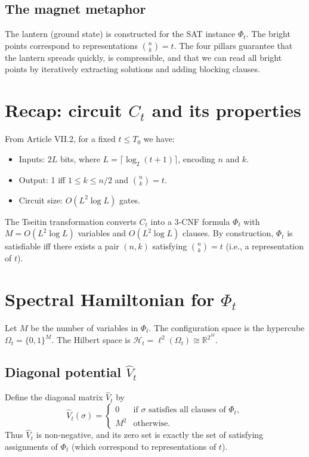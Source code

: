 \documentclass[11pt,a4paper]{article}
\begin{document}
\subsection{The magnet metaphor}

The lantern (ground state) is constructed for the SAT instance \(\Phi_t\). The bright points correspond to representations \(\binom{n}{k}=t\). The four pillars guarantee that the lantern spreads quickly, is compressible, and that we can read all bright points by iteratively extracting solutions and adding blocking clauses.

\section{Recap: circuit \(C_t\) and its properties}

From Article VII.2, for a fixed \(t \le T_0\) we have:
\begin{itemize}
\item Inputs: \(2L\) bits, where \(L = \lceil \log_2(t+1)\rceil\), encoding \(n\) and \(k\).
\item Output: 1 iff \(1\le k\le n/2\) and \(\binom{n}{k}=t\).
\item Circuit size: \(O(L^2 \log L)\) gates.
\end{itemize}

The Tseitin transformation converts \(C_t\) into a 3‑CNF formula \(\Phi_t\) with \(M = O(L^2 \log L)\) variables and \(O(L^2 \log L)\) clauses. By construction, \(\Phi_t\) is satisfiable iff there exists a pair \((n,k)\) satisfying \(\binom{n}{k}=t\) (i.e., a representation of \(t\)).

\section{Spectral Hamiltonian for \(\Phi_t\)}

Let \(M\) be the number of variables in \(\Phi_t\). The configuration space is the hypercube \(\Omega_t = \{0,1\}^M\). The Hilbert space is \(\mathcal{H}_t = \ell^2(\Omega_t) \cong \mathbb{R}^{2^M}\).

\subsection{Diagonal potential \(\hat{V}_t\)}
Define the diagonal matrix \(\hat{V}_t\) by
\[
\hat{V}_t(\sigma) = \begin{cases}
0 & \text{if }\sigma\text{ satisfies all clauses of } \Phi_t,\\
M^2 & \text{otherwise}.
\end{cases}
\]
Thus \(\hat{V}_t\) is non‑negative, and its zero set is exactly the set of satisfying assignments of \(\Phi_t\) (which correspond to representations of \(t\)).
\end{document}
